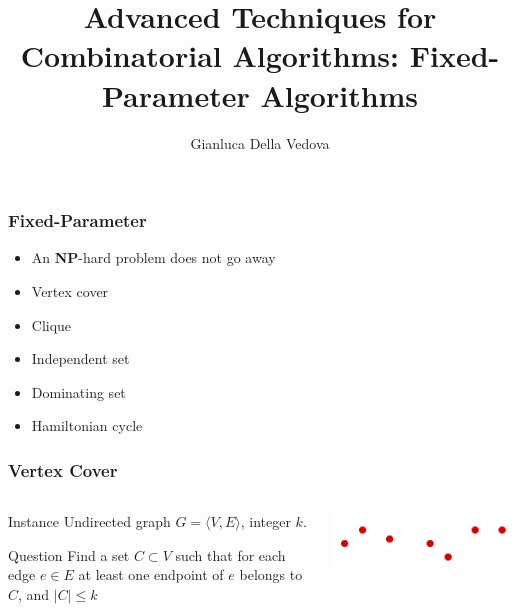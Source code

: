 \documentclass[12pt,aspectratio=169]{beamer}
\author{Gianluca Della Vedova}
\title[Advanced Algorithms]{Advanced Techniques for Combinatorial Algorithms:
Fixed-Parameter Algorithms}
\institute[]{Univ. Milano--Bicocca\\
  \texttt{https://gianluca.dellavedova.org}}
\begin{document}
\begin{frame}
  \titlepage
\end{frame}



\begin{frame}\frametitle{Fixed-Parameter}
  \begin{itemize}
  \item
    An \textbf{NP}-hard problem does not go away
  \item
    Vertex cover
  \item
    Clique
  \item
    Independent set
  \item
    Dominating set
  \item
    Hamiltonian cycle
  \end{itemize}
\end{frame}

\begin{frame}\frametitle{Vertex Cover }
\begin{columns} 
  \begin{column}{0.48\textwidth}
  \begin{block}{Instance}
    Undirected graph $G=\langle V,E \rangle$, integer $k$.
  \end{block}
  \begin{block}{Question}
    Find a set $C\subset V$ such that for each edge $e\in E$ at least one endpoint of $e$
    belongs to $C$, and $|C|\le k$
  \end{block}
\end{column}
    
    \begin{column}{0.48\textwidth}
      \centering

  \includegraphics[height=0.2\textheight]{img/Vertex-cover}
\end{column}
\end{columns}
\end{frame}
\end{document}
